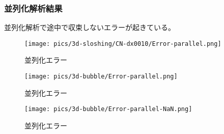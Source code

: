 \subsubsection{並列化解析結果}
並列化解析で途中で収束しないエラーが起きている。

\begin{figure}[H]
    \centering
	\texttt{[image: pics/3d-sloshing/CN-dx0010/Error-parallel.png]}
	\caption{並列化エラー}
	\label{fig:3d-sloshing-error-parallel}
\end{figure}


\begin{figure}[H]
    \centering
	\texttt{[image: pics/3d-bubble/Error-parallel.png]}
	\caption{並列化エラー}
	\label{fig:3d-sloshing-error-parallel}
\end{figure}

\begin{figure}[H]
    \centering
	\texttt{[image: pics/3d-bubble/Error-parallel-NaN.png]}
	\caption{並列化エラー}
	\label{fig:3d-sloshing-error-parallel}
\end{figure}